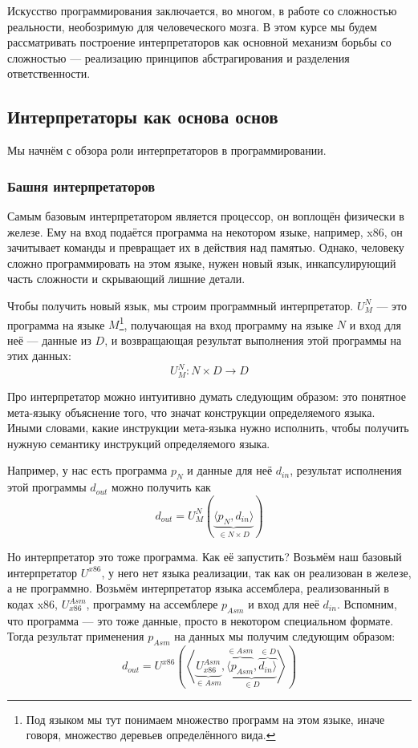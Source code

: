 
Искусство программирования заключается, во многом, в работе со сложностью реальности, необозримую для человеческого мозга.
В этом курсе мы будем рассматривать построение интерпретаторов как основной механизм борьбы со сложностью --- реализацию принципов абстрагирования и разделения ответственности.

\subsection{Интерпретаторы как основа основ}

Мы начнём с обзора роли интерпретаторов в программировании.

\subsubsection{Башня интерпретаторов} \label{subsec:interpreters-tower}

Самым базовым интерпретатором является процессор, он воплощён физически в железе.
Ему на вход подаётся программа на некотором языке, например, x86, он зачитывает команды и превращает их в действия над памятью.
Однако, человеку сложно программировать на этом языке, нужен новый язык, инкапсулирующий часть сложности и скрывающий лишние детали.

Чтобы получить новый язык, мы строим программный интерпретатор.
 $U_M^N$ --- это программа на языке $M$\footnote{Под языком мы тут понимаем множество программ на этом языке, иначе говоря, множество деревьев определённого вида.}, получающая на вход программу на языке $N$ и вход для неё --- данные из $D$, и возвращающая результат выполнения этой программы на этих данных: \[U_M^N : N\times D\to D\]

Про интерпретатор можно интуитивно думать следующим образом: это понятное мета-языку объяснение того, что значат конструкции определяемого языка.
Иными словами, какие инструкции мета-языка нужно исполнить, чтобы получить нужную семантику инструкций определяемого языка.

Например, у нас есть программа $p_N$ и данные для неё $d_{in}$, результат исполнения этой программы $d_{out}$ можно получить как \[d_{out} = U_M^N\left( \underbrace{\langle p_N, d_{in} \rangle}_{\in N\times D} \right)\]

Но интерпретатор это тоже программа.
Как её запустить?
Возьмём наш базовый интерпретатор $U^{x86}$, у него нет языка реализации, так как он реализован в железе, а не программно.
Возьмём интерпретатор языка ассемблера, реализованный в кодах x86, $U_{x86}^{Asm}$, программу на ассемблере $p_{Asm}$ и вход для неё $d_{in}$.
Вспомним, что программа --- это тоже данные, просто в некотором специальном формате.
Тогда результат применения $p_{Asm}$ на данных мы получим следующим образом:
\[
    d_{out} = U^{x86}\left(\left<\underbrace{U_{x86}^{Asm}}_{\in Asm}, \underbrace{\overbrace{\langle p_{Asm}}^{\in Asm}, \overbrace{d_{in} \rangle}^{\in D}}_{\in D} \right>\right)
\]

